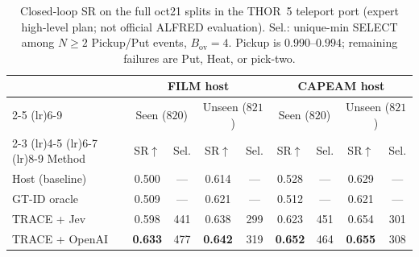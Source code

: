 \begin{table}[t]
\centering
\caption{Closed-loop SR on the full oct21 splits in the THOR~5 teleport port (expert high-level plan; not official ALFRED evaluation).
Sel.: unique-min SELECT among $N\ge 2$ Pickup/Put events, $B_{\mathrm{ov}}{=}4$.
Pickup is $0.990$--$0.994$; remaining failures are Put, Heat, or pick-two.}
\label{tab:thor}
\scriptsize
\setlength{\tabcolsep}{3.5pt}
\begin{tabular}{lcccccccc}
\toprule
& \multicolumn{4}{c}{FILM host} & \multicolumn{4}{c}{CAPEAM host} \\
\cmidrule(lr){2-5} \cmidrule(lr){6-9}
& \multicolumn{2}{c}{Seen ($820$)} & \multicolumn{2}{c}{Unseen ($821$)} & \multicolumn{2}{c}{Seen ($820$)} & \multicolumn{2}{c}{Unseen ($821$)} \\
\cmidrule(lr){2-3} \cmidrule(lr){4-5} \cmidrule(lr){6-7} \cmidrule(lr){8-9}
Method & SR$\uparrow$ & Sel. & SR$\uparrow$ & Sel. & SR$\uparrow$ & Sel. & SR$\uparrow$ & Sel. \\
\midrule
Host (baseline) & 0.500 & --- & 0.614 & --- & 0.528 & --- & 0.629 & --- \\
GT-ID oracle & 0.509 & --- & 0.621 & --- & 0.512 & --- & 0.621 & --- \\
TRACE + Jev & 0.598 & 441 & 0.638 & 299 & 0.623 & 451 & 0.654 & 301 \\
TRACE + OpenAI & \textbf{0.633} & 477 & \textbf{0.642} & 319 & \textbf{0.652} & 464 & \textbf{0.655} & 308 \\
\bottomrule
\end{tabular}
\end{table}
